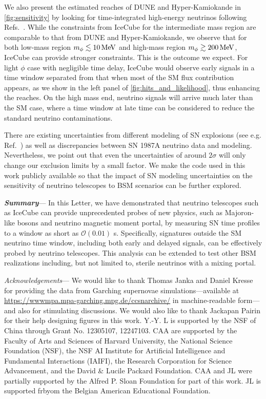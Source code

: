 \documentclass[aps,twocolumn,prl,showpacs,showkeys,preprintnumbers,superscriptaddress,nobibnotes,floatfix,longbibliography,notitlepage,nofootinbib]{revtex4-2}
\begin{document}
We also present the estimated reaches of DUNE and Hyper-Kamiokande in \cref{fig:sensitivity} by looking for time-integrated high-energy neutrinos following Refs.~\cite{Fiorillo:2022cdq, Brdar:2023tmi}.
While the constraints from IceCube for the intermediate mass region are comparable to that from DUNE and Hyper-Kamiokande, we observe that for both low-mass region $m_\phi \lesssim \unit[10]{MeV}$ and high-mass region $m_\phi \gtrsim \unit[200]{MeV}$, IceCube can provide stronger constraints.
This is the outcome we expect.
For light $\phi$ case with negligible time delay, IceCube would observe early signals in a time window separated from that when most of the SM flux contribution appears, as we show in the left panel of \cref{fig:hits_and_likelihood}, thus enhancing the reaches. On the high mass end, neutrino signals will arrive much later than the SM case, where a time window at late time can be considered to reduce the standard neutrino contaminations. 

There are existing uncertainties from different modeling of SN explosions (see e.g. Ref.~\cite{li2023old}) as well as discrepancies between SN 1987A neutrino data and modeling. Nevertheless, we point out that even the uncertainties of around $2\sigma$  will only change our exclusion limits by a small factor.
We make the code used in this work publicly available so that the impact of SN modeling uncertainties on the sensitivity of neutrino telescopes to BSM scenarios can be further explored.

\textbf{\textit{Summary}}---
In this Letter, we have demonstrated that neutrino telescopes such as IceCube can provide unprecedented probes of new physics, such as Majoron-like bosons and neutrino magnetic moment portal, by measuring SN time profiles to a window as short as $\mathcal{O}(0.01)$ s. Specifically, signatures outside the SM neutrino time window, including both early and delayed signals, can be effectively probed by neutrino telescopes. This analysis can be extended to test other BSM realizations including, but not limited to, sterile neutrinos with a mixing portal. 

\textit{Acknowledgements}---
We would like to thank Thomas Janka and Daniel Kresse for providing the data from Garching supernovae simulations---available at \url{https://wwwmpa.mpa-garching.mpg.de/ccsnarchive/} in machine-readable form---and also for stimulating discussions.
We would also like to thank Jackapan Pairin for their help designing figures in this work.
Y.-Y. L is supported by the NSF of China through Grant No. 12305107, 12247103.
CAA are supported by the Faculty of Arts and Sciences of Harvard University, the National Science Foundation (NSF), the NSF AI Institute for Artificial Intelligence and Fundamental Interactions (IAIFI), the Research Corporation for Science Advancement, 
and the David \& Lucile Packard Foundation.
CAA and JL were partially supported by the Alfred P. Sloan Foundation for part of this work.
JL is supported frbyom the Belgian American Educational Foundation.
\end{document}
